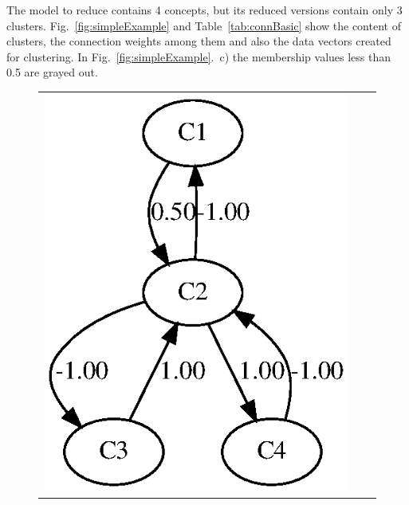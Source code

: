 \documentclass[graybox]{svmult}
\begin{document}
The model to reduce contains 4 concepts, but its reduced versions 
contain only 3 clusters. Fig.~\ref{fig:simpleExample} and 
Table~\ref{tab:connBasic} show the content of clusters, the connection 
weights among them and also the data vectors created for clustering. In 
Fig.~\ref{fig:simpleExample}.~c) the membership values less than 0.5 
are grayed out.

\begin{center}
  \begin{figure}
    \setlength\tabcolsep{.2cm}
    \begin{tabular}{p{}p{}p{}}
      \includegraphics[width=\linewidth]{original.eps} &

\end{tabular}
\end{figure}
\end{center}
\end{document}
